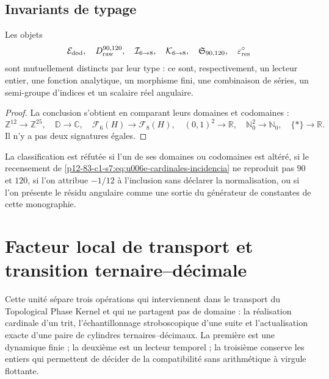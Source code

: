 {\subsection{Invariants de typage}

\begin{theorem}
\label{p12-83-c1-s7:thm:u006e-separacion-seis-objetos}
Les objets
\begin{equation}
 \mathcal E_{\rm dod},\quad
 D_{\rm raw}^{90,120},\quad
 \mathcal I_{6\to8},\quad
 \mathcal K_{6\to8},\quad
 \mathfrak S_{90,120},\quad
 \varepsilon_{\rm res}^{\circ}
 \label{p12-83-c1-s7:eq:u006e-seis-objetos}
\end{equation}
sont mutuellement distincts par leur type : ce sont, respectivement, un lecteur entier,
une fonction analytique, un morphisme fini, une combinaison de séries, un
semi-groupe d’indices et un scalaire réel angulaire.
\end{theorem}

\begin{proof}
La conclusion s’obtient en comparant leurs domaines et codomaines :
\[
 \mathbb Z^{12}\to\mathbb Z^{25},\quad
 \mathbb D\to\mathbb C,\quad
 \mathcal F_6(H)\to\mathcal F_8(H),\quad
 (0,1)^2\to\mathbb R,\quad
 \mathbb N_0^2\to\mathbb N_0,\quad
 \{\ast\}\to\mathbb R.
\]
Il n’y a pas deux signatures égales.
\end{proof}

\begin{criterion}
\label{p12-83-c1-s7:crit:u006e-refutacion}
La classification est réfutée si l’un de ses domaines ou
codomaines est altéré, si le recensement de
\eqref{p12-83-c1-s7:eq:u006e-cardinales-incidencia} ne reproduit pas \(90\) et \(120\), si
l’on attribue \(-1/12\) à l’inclusion sans déclarer la normalisation, ou si
l’on présente le résidu angulaire comme une sortie du générateur de constantes de
cette monographie.
\end{criterion}



\section{Facteur local de transport et transition ternaire--décimale}
\label{p12-83-c1-s8:chap:tpk-factor-local-transicion-cilindros}

Cette unité sépare trois opérations qui interviennent dans le transport du
Topological Phase Kernel et qui ne partagent pas de domaine : la réalisation cardinale
d’un trit, l’échantillonnage stroboscopique d’une suite et l’actualisation
exacte d’une paire de cylindres ternaires--décimaux. La première est une dynamique
finie ; la deuxième est un lecteur temporel ; la troisième conserve les entiers
qui permettent de décider de la compatibilité sans arithmétique à virgule flottante.

}
